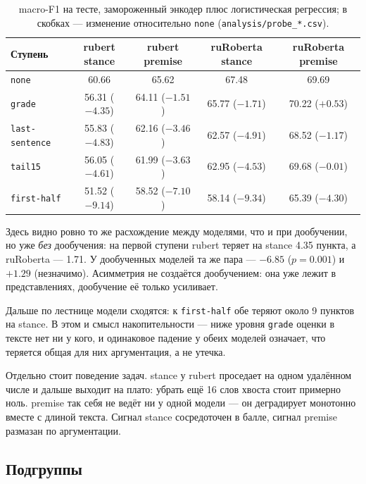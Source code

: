 \documentclass{article}
\begin{document}
\begin{table}[!tbh]
\centering
\begin{tabular}{lcccc}
\toprule
Ступень & rubert stance & rubert premise & ruRoberta stance & ruRoberta premise \\
\midrule
\texttt{none}          & 60.66 & 65.62 & 67.48 & 69.69 \\
\texttt{grade}         & 56.31 ($\mathbf{-4.35}$) & 64.11 ($-1.51$) & 65.77 ($-1.71$) & 70.22 ($+0.53$) \\
\texttt{last-sentence} & 55.83 ($-4.83$) & 62.16 ($-3.46$) & 62.57 ($-4.91$) & 68.52 ($-1.17$) \\
\texttt{tail15}        & 56.05 ($-4.61$) & 61.99 ($-3.63$) & 62.95 ($-4.53$) & 69.68 ($-0.01$) \\
\texttt{first-half}    & 51.52 ($-9.14$) & 58.52 ($-7.10$) & 58.14 ($-9.34$) & 65.39 ($-4.30$) \\
\bottomrule
\end{tabular}
\caption{macro-F1 на тесте, замороженный энкодер плюс логистическая регрессия;
в скобках --- изменение относительно \texttt{none} (\texttt{analysis/probe\_*.csv}).}
\label{tab:probe}
\end{table}

Здесь видно ровно то же расхождение между моделями, что и при дообучении, но уже
\emph{без} дообучения: на первой ступени rubert теряет на stance 4.35 пункта,
а ruRoberta --- 1.71. У дообученных моделей та же пара --- $-6.85$ ($p=0.001$)
и $+1.29$ (незначимо). Асимметрия не создаётся дообучением: она уже лежит
в представлениях, дообучение её только усиливает.

Дальше по лестнице модели сходятся: к \texttt{first-half} обе теряют около 9 пунктов
на stance. В этом и смысл накопительности --- ниже уровня \texttt{grade} оценки в тексте
нет ни у кого, и одинаковое падение у обеих моделей означает, что теряется общая
для них аргументация, а не утечка.

Отдельно стоит поведение задач. stance у rubert проседает на одном удалённом числе
и дальше выходит на плато: убрать ещё 16 слов хвоста стоит примерно ноль. premise так
себя не ведёт ни у одной модели --- он деградирует монотонно вместе с длиной текста.
Сигнал stance сосредоточен в балле, сигнал premise размазан по аргументации.

\subsection{Подгруппы}
\end{document}
